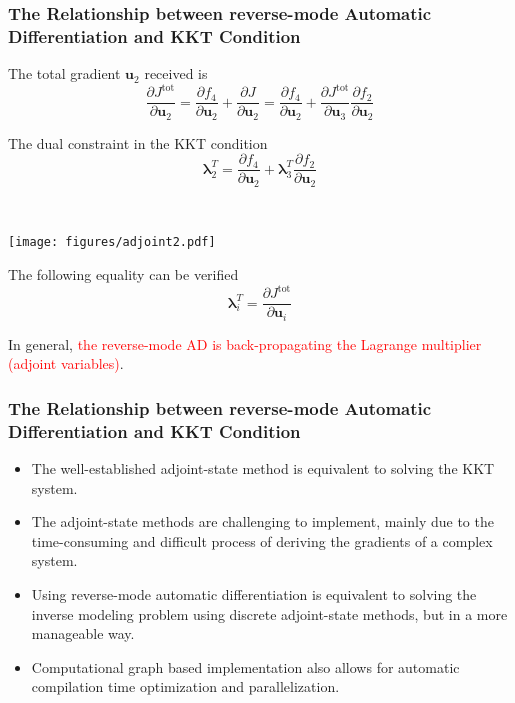 \documentclass[usenames,dvipsnames]{beamer}
\newcommand{\bu}{\mathbf{u}}
\begin{document}
\begin{frame}
\frametitle{The  Relationship between reverse-mode Automatic Differentiation and KKT Condition}

\begin{minipage}[b]{0.48\textwidth}
	The total gradient $\bu_2$ received is
$$  \frac{\partial J^{\mathrm{tot}}}{\partial \bu_2}  = \frac{\partial f_4}{\partial \bu_2} + \frac{\partial J}{\partial \bu_2} = \frac{\partial f_4}{\partial \bu_2} + \frac{\partial J^{\mathrm{tot}}}{\partial \bu_3} \frac{\partial f_2}{\partial \bu_2}$$

The dual constraint in the KKT condition
$$\bm{\lambda}_2^T = \frac{\partial f_4}{\partial  \mathbf{u}_2} + \bm{\lambda}_3^T\frac{\partial f_2}{\partial  \mathbf{u}_2}$$
\end{minipage}~
\begin{minipage}[b]{0.48\textwidth}
\centering
	\texttt{[image: figures/adjoint2.pdf]}
\end{minipage}


	 
The following equality can be verified 
\begin{equation*}
	\boxed{\bm{\lambda}_i^T = \frac{\partial J^{\mathrm{tot}}}{\partial \bu_i}}
\end{equation*}

In general, \textcolor{red}{the reverse-mode AD is back-propagating the Lagrange multiplier (adjoint variables)}. 
\end{frame}

\begin{frame}
\frametitle{The  Relationship between reverse-mode Automatic Differentiation and KKT Condition}
\begin{itemize}
	\item The well-established adjoint-state method is equivalent to solving the KKT system. 
	\item The adjoint-state methods are challenging to implement, mainly due to the time-consuming and difficult process of deriving the gradients of a complex system. 
	\item Using reverse-mode automatic differentiation is equivalent to solving the inverse modeling problem using discrete adjoint-state methods, but in a more manageable way. 
	\item Computational graph based implementation also allows for automatic compilation time optimization and parallelization.  
\end{itemize}
	 
\end{frame}
\end{document}
